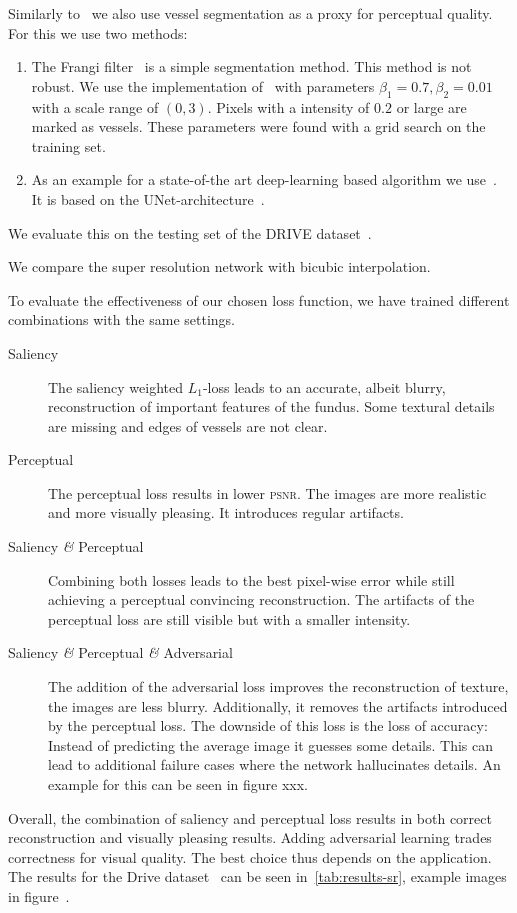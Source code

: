 \documentclass{scrartcl}
\begin{document}
Similarly to~\cite{SaliencyGAN} we also use vessel segmentation as a proxy for perceptual quality.
For this we use two methods:
\begin{enumerate}
  \item The Frangi filter~\cite{Frangi} is a simple segmentation method.
  This method is not robust.
  We use the implementation of~\cite{Scikit-image} with parameters $\beta_1 = 0.7, \beta_2=0.01$ with a scale range of $(0, 3)$.
  Pixels with a intensity of $0.2$ or large are marked as vessels.
  These parameters were found with a grid search on the training set.
\item As an example for a state-of-the art deep-learning based algorithm we use~\cite{RetinaUnet}.
  It is based on the UNet-architecture~\cite{Unet}.
\end{enumerate}
We evaluate this on the testing set of the DRIVE dataset~\cite{Drive}.

We compare the super resolution network with bicubic interpolation.

To evaluate the effectiveness of our chosen loss function, we have trained different combinations with the same settings.
\begin{description}
\item[Saliency] The saliency weighted $L_1$-loss leads to an accurate, albeit blurry, reconstruction of important features of the fundus.
  Some textural details are missing and edges of vessels are not clear.
\item[Perceptual] The perceptual loss results in lower \textsc{psnr}.
  The images are more realistic and more visually pleasing.
  It introduces regular artifacts.
\item[Saliency \textit{\&} Perceptual] Combining both losses leads to the best pixel-wise error while still achieving a perceptual convincing reconstruction.
  The artifacts of the perceptual loss are still visible but with a smaller intensity.
\item[Saliency \textit{\&} Perceptual \textit{\&} Adversarial]
  The addition of the adversarial loss improves the reconstruction of texture, the images are less blurry.
  Additionally, it removes the artifacts introduced by the perceptual loss.
  The downside of this loss is the loss of accuracy:
  Instead of predicting the average image it guesses some details.
  This can lead to additional failure cases where the network hallucinates details.
  An example for this can be seen in figure xxx.
\end{description}
Overall, the combination of saliency and perceptual loss results in both correct reconstruction and visually pleasing results.
Adding adversarial learning trades correctness for visual quality.
The best choice thus depends on the application.
The results for the Drive dataset~\cite{Drive} can be seen in~\cref{tab:results-sr}, example images in figure~.
\end{document}
